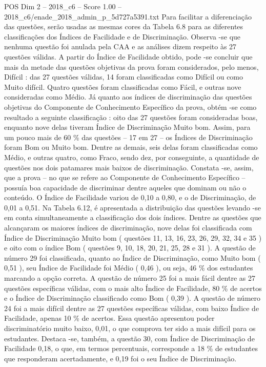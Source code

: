 \begin{textsample}{POS Dim 2 – 2018\_c6 – Score 1.00 – 2018\_c6/enade\_2018\_admin\_p\_5d727a5391.txt}
Para facilitar a diferenciação das questões, serão usadas as mesmas cores da Tabela 6.8 para as diferentes classificações dos Índices de Facilidade e de Discriminação.
Observa -se que nenhuma questão foi anulada pela CAA e as análises dizem respeito às 27 questões válidas.
A partir do Índice de Facilidade obtido, pode -se concluir que mais da metade das questões objetivas da prova foram considerados, pelo menos, Difícil : das 27 questões válidas, 14 foram classificadas como Difícil ou como Muito difícil.
Quatro questões foram classificadas como Fácil, e outras nove consideradas como Médio.
Já quanto aos índices de discriminação das questões objetivas do Componente de Conhecimento Específico da prova, obtém -se como resultado a seguinte classificação : oito das 27 questões foram consideradas boas, enquanto nove delas tiveram Índice de Discriminação Muito bom.
Assim, para um pouco mais de 60 \% das questões – 17 em 27 – os Índices de Discriminação foram Bom ou Muito bom.
Dentre as demais, seis delas foram classificadas como Médio, e outras quatro, como Fraco, sendo dez, por conseguinte, a quantidade de questões nos dois patamares mais baixos de discriminação.
Constata -se, assim, que a prova – no que se refere ao Componente de Conhecimento Específico – possuía boa capacidade de discriminar dentre aqueles que dominam ou não o conteúdo.
O Índice de Facilidade variou de 0,10 a 0,80, e o de Discriminação, de 0,01 a 0,51.
Na Tabela 6.12, é apresentada a distribuição das questões levando -se em conta simultaneamente a classificação dos dois índices.
Dentre as questões que alcançaram os maiores índices de discriminação, nove delas foi classificada com Índice de Discriminação Muito bom ( questões 11, 13, 16, 23, 26, 29, 32, 34 e 35 ) e oito com o índice Bom ( questões 9, 10, 18, 20, 21, 25, 28 e 31 ).
A questão de número 29 foi classificada, quanto ao Índice de Discriminação, como Muito bom ( 0,51 ), seu Índice de Facilidade foi Médio ( 0,46 ), ou seja, 46 \% dos estudantes marcando a opção correta.
A questão de número 25 foi a mais fácil dentre as 27 questões específicas válidas, com o mais alto Índice de Facilidade, 80 \% de acertos e o Índice de Discriminação classificado como Bom ( 0,39 ).
A questão de número 24 foi a mais difícil dentre as 27 questões específicas válidas, com baixo Índice de Facilidade, apenas 10 \% de acertos.
Essa questão apresentou poder discriminatório muito baixo, 0,01, o que comprova ter sido a mais difícil para os estudantes.
Destaca -se, também, a questão 30, com Índice de Discriminação de Facilidade 0,18, o que, em termos percentuais, corresponde a 18 \% de estudantes que responderam acertadamente, e 0,19 foi o seu Índice de Discriminação.

\end{textsample}
